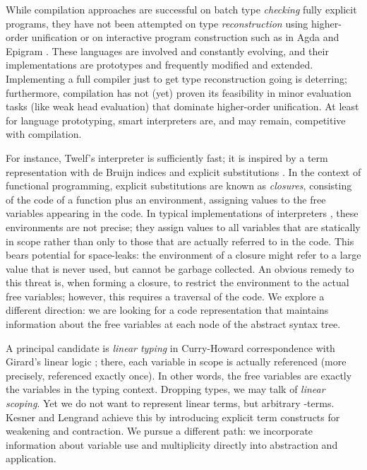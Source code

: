 \documentclass[submission,copyright,creativecommons]{eptcs}
\begin{document}
While compilation approaches are successful on batch type \emph{checking}
fully explicit programs, they have not been attempted on type
\emph{reconstruction} using higher-order unification or on interactive
program construction such as in Agda and Epigram \cite{mcBrideMcKinna:view}.
These languages are involved and constantly evolving, 
and their implementations are
prototypes and frequently modified and extended.  Implementing a
full compiler just to get type reconstruction going is deterring;
furthermore, compilation has not (yet) proven its feasibility in minor
evaluation tasks (like weak head evaluation)
that dominate higher-order unification.  
At least for language prototyping, smart
interpreters are, and may remain, competitive with compilation.  

For instance, Twelf's interpreter is sufficiently fast; it is 
inspired by a term representation with de Bruijn indices 
\cite{deBruijn:nameless} and explicit substitutions 
\cite{abadiCardelliCurienLevy:jfp91}.  In the context of functional
programming, explicit substitutions are known as \emph{closures},
consisting of the code of a function plus an environment, assigning
values to the free variables appearing in the code.  
In typical implementations of interpreters \cite{coquand:type}, 
these environments are not
precise; they assign values to all variables that are statically in
scope rather than only to those that are actually referred to in the
code.  This bears potential for space-leaks: the environment of a
closure might refer to a large value that is never used, but cannot be
garbage collected.  An obvious remedy to this threat is, when forming
a closure, to restrict the environment to the actual free variables;
however, this requires a traversal of the code.  We explore a
different direction: we are looking for a code representation that
maintains information about the free variables at each node of the
abstract syntax tree.

A principal candidate is \emph{linear typing} in Curry-Howard
correspondence with Girard's linear logic \cite{girard:linear}; there,
each variable in scope is actually referenced (more precisely,
referenced exactly once).  In other words, the
free variables are exactly the variables in the typing context.
Dropping types, we may talk of \emph{linear scoping}.
Yet we do not want to represent linear terms, but arbitrary
-terms.   Kesner and Lengrand \cite{kesnerLengrand:infcomp07}
achieve this by introducing explicit term constructs for weakening and
contraction.  We pursue a different path: we incorporate information
about variable use and multiplicity directly into abstraction and
application. 
\end{document}
